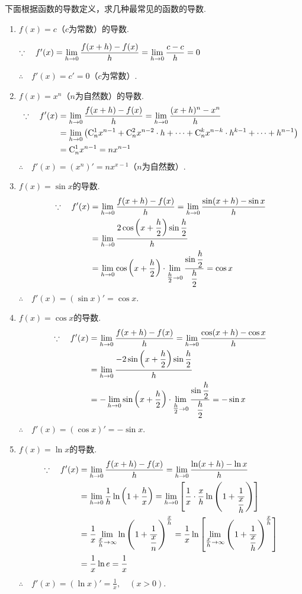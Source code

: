 下面根据函数的导数定义，求几种最常见的函数的导数.
\begin{enumerate}
    \item $f(x)=c$（$c$为常数）的导数.

    $\because\quad f'(x)=\lim\limits_{h\to 0}\dfrac{f(x+h)-f(x)}{h}=\lim\limits_{h\to 0}\dfrac{c-c}{h}=0$

$\therefore\quad    f'(x)=c'=0$（$c$为常数）.
    \item $f(x)=x^n$（$n$为自然数）的导数.
\[\begin{split}
    \because\quad f'(x)&=\lim\limits_{h\to 0}\dfrac{f(x+h)-f(x)}{h}=\lim\limits_{h\to 0}\dfrac{(x+h)^n-x^n}{h}\\
&=\lim\limits_{h\to 0}\left({\rm C}^1_n x^{n-1}+{\rm C}^2_nx^{n-2}\cdot h+\cdots+{\rm C}^k_nx^{n-k}\cdot h^{k-1}+\cdots +h^{n-1}\right)\\
&={\rm C}^1_nx^{n-1}=nx^{n-1}
\end{split}\]
$\therefore\quad f'(x)=(x^n)'=nx^{x-1}$（$n$为自然数）.
    \item $f(x)=\sin x$的导数.
    \[\begin{split}
        \because\quad f'(x)&=\lim\limits_{h\to 0}\dfrac{f(x+h)-f(x)}{h}=\lim\limits_{h\to 0}\dfrac{\sin (x+h)-\sin x}{h}\\
    &=\lim\limits_{h\to 0}\dfrac{2\cos \left(x+\dfrac{h}{2}\right)\sin \dfrac{h}{2}}{h}\\
    &=\lim\limits_{h\to 0}\cos \left(x+\dfrac{h}{2}\right)\cdot \lim\limits_{\tfrac{h}{2}\to 0}\dfrac{\sin\dfrac{h}{2}}{\dfrac{h}{2}}=\cos x
    \end{split}\]
    $\therefore\quad f'(x)=(\sin x)'=\cos x$.

\item $f(x)=\cos x$的导数.
\[\begin{split}
    \because\quad f'(x)&=\lim\limits_{h\to 0}\dfrac{f(x+h)-f(x)}{h}=\lim\limits_{h\to 0}\dfrac{\cos (x+h)-\cos x}{h}\\
&=\lim\limits_{h\to 0}\dfrac{-2\sin \left(x+\dfrac{h}{2}\right)\sin \dfrac{h}{2}}{h}\\
&=-\lim\limits_{h\to 0}\sin \left(x+\dfrac{h}{2}\right)\cdot \lim\limits_{\tfrac{h}{2}\to 0}\dfrac{\sin\dfrac{h}{2}}{\dfrac{h}{2}}=-\sin x
\end{split}\]
$\therefore\quad f'(x)=(\cos x)'=-\sin x$.

\item $f(x)=\ln x$的导数.
\[\begin{split}
    \because\quad f'(x)&=\lim\limits_{h\to 0}\dfrac{f(x+h)-f(x)}{h}=\lim\limits_{h\to 0}\dfrac{\ln (x+h)-\ln x}{h}\\
&=\lim\limits_{h\to 0}\dfrac{1}{h}\ln\left(1+\dfrac{h}{x}\right)=\lim\limits_{h\to 0}\left[\dfrac{1}{x}\cdot \dfrac{x}{h}\ln\left(1+\dfrac{1}{\dfrac{x}{h}}\right)\right]\\
&=\dfrac{1}{x}\lim_{\tfrac{x}{h}\to \infty}\ln\left(1+\dfrac{1}{\dfrac{x}{n}}\right)^{\tfrac{x}{h}}=\dfrac{1}{x}\ln\left[\lim_{\tfrac{x}{h}\to\infty}\left(1+\dfrac{1}{\dfrac{x}{h}}\right)^{\tfrac{x}{h}}\right]\\
&=\dfrac{1}{x}\ln e=\dfrac{1}{x}
\end{split}\]
$\therefore\quad f'(x)=(\ln x)'=\frac{1}{x},\quad (x>0)$.
\end{enumerate}

